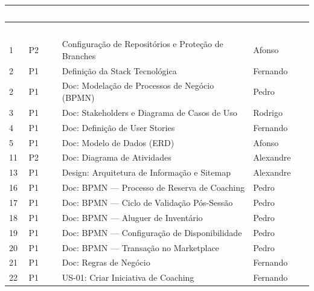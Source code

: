 \documentclass[12pt,a4paper]{report}
\begin{document}
\begin{longtable}{@{}p{} | p{} | p{} | p{}@{}}
\toprule
\rowcolor{headerblue}
\textbf{\textcolor{white}{ID}} & \textbf{\textcolor{white}{Prior.}} & \textbf{\textcolor{white}{Tarefa}} & \textbf{\textcolor{white}{Responsável}} \\ \midrule
\endfirsthead

\toprule
\rowcolor{headerblue}
\textbf{\textcolor{white}{ID}} & \textbf{\textcolor{white}{Prior.}} & \textbf{\textcolor{white}{Tarefa}} & \textbf{\textcolor{white}{Responsável}} \\ \midrule
\endhead

1  & P2 & Configuração de Repositórios e Proteção de Branches  & Afonso    \\ \midrule
2  & P1 & Definição da Stack Tecnológica                        & Fernando  \\ \midrule
2  & P1 & Doc: Modelação de Processos de Negócio (BPMN)         & Pedro     \\ \midrule
3  & P1 & Doc: Stakeholders e Diagrama de Casos de Uso          & Rodrigo   \\ \midrule
4  & P1 & Doc: Definição de User Stories                        & Fernando  \\ \midrule
5  & P1 & Doc: Modelo de Dados (ERD)                            & Afonso    \\ \midrule
11 & P2 & Doc: Diagrama de Atividades                           & Alexandre \\ \midrule
13 & P1 & Design: Arquitetura de Informação e Sitemap           & Alexandre \\ \midrule
16 & P1 & Doc: BPMN — Processo de Reserva de Coaching          & Pedro     \\ \midrule
17 & P1 & Doc: BPMN — Ciclo de Validação Pós-Sessão            & Pedro     \\ \midrule
18 & P1 & Doc: BPMN — Aluguer de Inventário                    & Pedro     \\ \midrule
19 & P1 & Doc: BPMN — Configuração de Disponibilidade          & Pedro     \\ \midrule
20 & P1 & Doc: BPMN — Transação no Marketplace                 & Pedro     \\ \midrule
21 & P1 & Doc: Regras de Negócio                               & Fernando  \\ \midrule
22 & P1 & US-01: Criar Iniciativa de Coaching                   & Fernando  \\ \midrule

\end{longtable}
\end{document}

